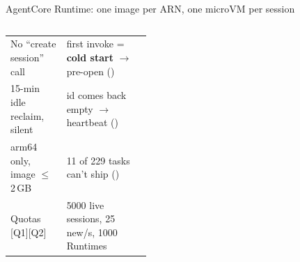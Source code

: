 \begin{frame}{AgentCore Runtime: one image per ARN, one microVM per session}
\begin{columns}[T]
\tiny
\begin{tabularx}{\linewidth}{@{}P{0.4\linewidth}Y@{}}
\toprule
No ``create session'' call & first invoke = \textbf{cold start} $\rightarrow$ pre-open ()\\
15-min idle reclaim, silent & id comes back empty $\rightarrow$ heartbeat ()\\
arm64 only, image $\le$ 2\,GB & 11 of 229 tasks can't ship ()\\
Quotas [Q1][Q2] & 5000 live sessions, 25 new/s, 1000 Runtimes\\
\bottomrule
\end{tabularx}
\end{columns}
\end{frame}

